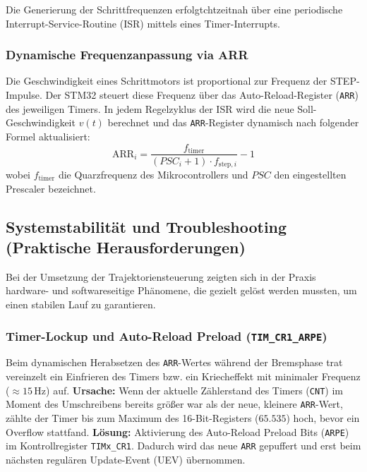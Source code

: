 Die Generierung der Schrittfrequenzen erfolgtchtzeitnah über eine periodische Interrupt-Service-Routine (ISR) mittels eines Timer-Interrupts.

\subsubsection{Dynamische Frequenzanpassung via ARR}
Die Geschwindigkeit eines Schrittmotors ist proportional zur Frequenz der STEP-Impulse. Der STM32 steuert diese Frequenz über das Auto-Reload-Register (\texttt{ARR}) des jeweiligen Timers. In jedem Regelzyklus der ISR wird die neue Soll-Geschwindigkeit $v(t)$ berechnet und das \texttt{ARR}-Register dynamisch nach folgender Formel aktualisiert:
\begin{equation}
	\text{ARR}_i = \frac{f_{\text{timer}}}{(PSC_i + 1) \cdot f_{\text{step}, i}} - 1
\end{equation}
wobei $f_{\text{timer}}$ die Quarzfrequenz des Mikrocontrollers und $PSC$ den eingestellten Prescaler bezeichnet.

\subsection{Systemstabilität und Troubleshooting (Praktische Herausforderungen)}
\label{subsec:troubleshooting}

Bei der Umsetzung der Trajektoriensteuerung zeigten sich in der Praxis hardware- und softwareseitige Phänomene, die gezielt gelöst werden mussten, um einen stabilen Lauf zu garantieren.

\subsubsection{Timer-Lockup und Auto-Reload Preload (\texttt{TIM\_CR1\_ARPE})}
Beim dynamischen Herabsetzen des \texttt{ARR}-Wertes während der Bremsphase trat vereinzelt ein Einfrieren des Timers bzw. ein Kriecheffekt mit minimaler Frequenz ($\approx 15\,\text{Hz}$) auf. 
\textbf{Ursache:} Wenn der aktuelle Zählerstand des Timers (\texttt{CNT}) im Moment des Umschreibens bereits größer war als der neue, kleinere \texttt{ARR}-Wert, zählte der Timer bis zum Maximum des 16-Bit-Registers ($65.535$) hoch, bevor ein Overflow stattfand.
\textbf{Lösung:} Aktivierung des Auto-Reload Preload Bits (\texttt{ARPE}) im Kontrollregister \texttt{TIMx\_CR1}. Dadurch wird das neue \texttt{ARR} gepuffert und erst beim nächsten regulären Update-Event (UEV) übernommen.

